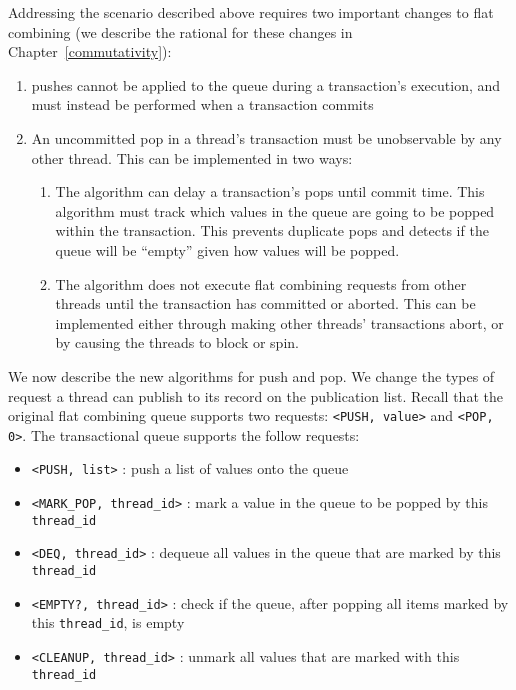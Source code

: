 Addressing the scenario described above requires two important changes to flat combining (we describe the rational for these changes in Chapter~\ref{commutativity}): 
\begin{enumerate}
\item pushes cannot be applied to the queue during a transaction's execution, and must instead be performed when a transaction commits
\item An uncommitted pop in a thread's transaction must be unobservable by any other thread. This can be implemented in two ways:  
    \begin{enumerate}
        \item The algorithm can delay a transaction's pops until commit time. This algorithm must track which values in the queue are going to be popped within the transaction. This prevents duplicate pops and detects if the queue will be ``empty'' given how values will be popped.
        \item The algorithm does not execute flat combining requests from other threads until the transaction has committed or aborted. This can be implemented either through making other threads' transactions abort, or by causing the threads to block or spin.
    \end{enumerate}
\end{enumerate}

We now describe the new algorithms for push and pop.  We change the types of request a thread can publish to its record on the publication list. Recall that the original flat combining queue supports two requests: \texttt{<PUSH, value>} and \texttt{<POP, 0>}. The transactional queue supports the follow requests:
\begin{itemize}
    \item \texttt{<PUSH, list>} : push a list of values onto the queue
    \item \texttt{<MARK\_POP, thread\_id>} : mark a value in the queue to be popped by this \texttt{thread\_id}
    \item \texttt{<DEQ, thread\_id>} : dequeue all values in the queue that are marked by this \texttt{thread\_id}
    \item \texttt{<EMPTY?, thread\_id>} : check if the queue, after popping all items marked by this \texttt{thread\_id}, is empty
    \item \texttt{<CLEANUP, thread\_id>} : unmark all values that are marked with this \texttt{thread\_id}
\end{itemize}

